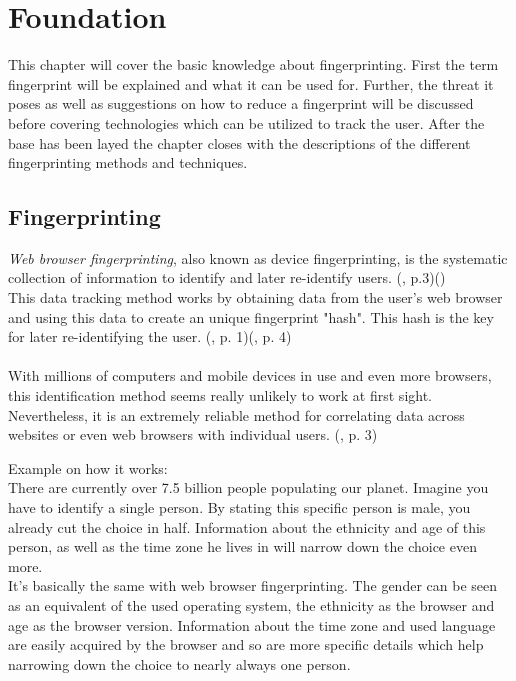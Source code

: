 \chapter{Foundation}
\label{cha:foundation}
This chapter will cover the basic knowledge about fingerprinting. First the term fingerprint will be explained and what it can be used for. Further, the threat it poses as well as suggestions on how to reduce a fingerprint will be discussed before covering technologies which can be utilized to track the user. After the base has been layed the chapter closes with the descriptions of the different fingerprinting methods and techniques.

\section{Fingerprinting}
\textit{Web browser fingerprinting}, also known as device fingerprinting, is the systematic collection of information to identify and later re-identify users. (\textcite{doty18}, p.3)(\textcite{amiunique})\\
This data tracking method works by obtaining data from the user's web browser and using this data to create an unique fingerprint "hash". This hash is the key for later re-identifying the user. (\textcite{upi15}, p. 1)(\textcite{havens16}, p. 4)\\\\
With millions of computers and mobile devices in use and even more browsers, this identification method seems really unlikely to work at first sight. Nevertheless, it is an extremely reliable method for correlating data across websites or even web browsers with individual users. (\textcite{havens16}, p. 3)\\
\begin{tcolorbox}
	Example on how it works:\\
	There are currently over 7.5 billion people populating our planet. Imagine you have to identify a single person. By stating this specific person is male, you already cut the choice in half. Information about the ethnicity and age of this person, as well as the time zone he lives in will narrow down the choice even more.\\
	It's basically the same with web browser fingerprinting. The gender can be seen as an equivalent of the used operating system, the ethnicity as the browser and age as the browser version. Information about the time zone and used language are easily acquired by the browser and so are more specific details which help narrowing down the choice to nearly always one person.
\end{tcolorbox}

